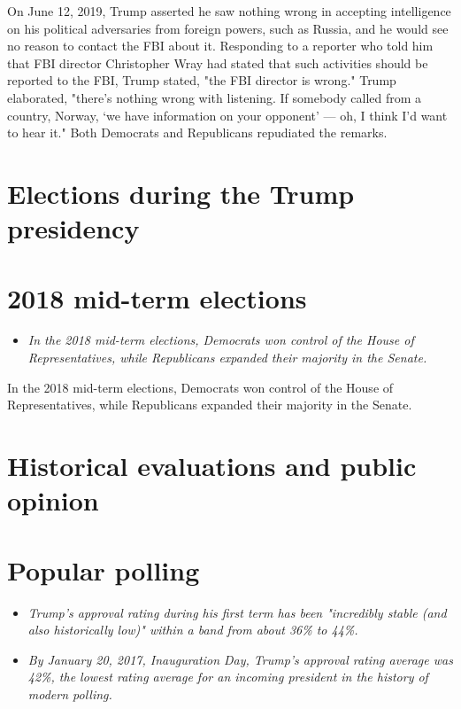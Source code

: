 On June 12, 2019, Trump asserted he saw nothing wrong in accepting
intelligence on his political adversaries from foreign powers, such as
Russia, and he would see no reason to contact the FBI about it.
Responding to a reporter who told him that FBI director Christopher Wray
had stated that such activities should be reported to the FBI, Trump
stated, "the FBI director is wrong." Trump elaborated, "there's nothing
wrong with listening. If somebody called from a country, Norway, `we
have information on your opponent' --- oh, I think I'd want to hear it."
Both Democrats and Republicans repudiated the remarks.

\section{Elections during the Trump
presidency}\label{elections-during-the-trump-presidency}

\section{2018 mid-term elections}\label{mid-term-elections}

\begin{itemize}
\item
  \emph{In the 2018 mid-term elections, Democrats won control of the
  House of Representatives, while Republicans expanded their majority in
  the Senate.}
\end{itemize}

In the 2018 mid-term elections, Democrats won control of the House of
Representatives, while Republicans expanded their majority in the
Senate.

\section{Historical evaluations and public
opinion}\label{historical-evaluations-and-public-opinion}

\section{Popular polling}\label{popular-polling}

\begin{itemize}
\item
  \emph{Trump's approval rating during his first term has been
  "incredibly stable (and also historically low)" within a band from
  about 36\% to 44\%.}
\item
  \emph{By January 20, 2017, Inauguration Day, Trump's approval rating
  average was 42\%, the lowest rating average for an incoming president
  in the history of modern polling.}
\end{itemize}

